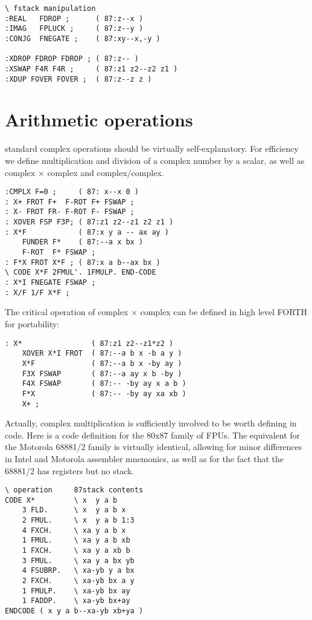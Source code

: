 \begin{lstlisting}
\ fstack manipulation
:REAL   FDROP ;      ( 87:z--x )
:IMAG   FPLUCK ;     ( 87:z--y )
:CONJG  FNEGATE ;    ( 87:xy--x,-y )

:XDROP FDROP FDROP ; ( 87:z-- )
:XSWAP F4R F4R ;     ( 87:z1 z2--z2 z1 )
:XDUP FOVER FOVER ;  ( 87:z--z z )
\end{lstlisting}

\section{Arithmetic operations}
 standard complex operations should be virtually self-explanatory. For efficiency we define multiplication and division of a complex number by a scalar, as well as complex $\times$ complex and complex/complex.

\begin{lstlisting}
:CMPLX F=0 ;     ( 87: x--x 0 )
: X+ FROT F+  F-ROT F+ FSWAP ;
: X- FROT FR- F-ROT F- FSWAP ;
: XOVER FSP F3P; ( 87:z1 z2--z1 z2 z1 )
: X*F            ( 87:x y a -- ax ay )
    FUNDER F*    ( 87:--a x bx )
    F-ROT  F* FSWAP ;
: F*X FROT X*F ; ( 87:x a b--ax bx )
\ CODE X*F 2FMUL'. 1FMULP. END-CODE
: X*I FNEGATE FSWAP ;
: X/F 1/F X*F ;
\end{lstlisting}

The critical operation of complex $\times$ complex can be defined in high level FORTH for portability:

\begin{lstlisting}
: X*                ( 87:z1 z2--z1*z2 )
    XOVER X*I FROT  ( 87:--a b x -b a y )
    X*F             ( 87:--a b x -by ay )
    F3X FSWAP       ( 87:--a ay x b -by )
    F4X FSWAP       ( 87:-- -by ay x a b )
    F*X             ( 87:-- -by ay xa xb )
    X+ ;
\end{lstlisting}

Actually, complex multiplication is sufficiently involved to be worth defining in code. Here is a code definition for the 80x87 family of FPUs. The equivalent for the Motorola 68881/2 family is virtually identical, allowing for minor differences in Intel and Motorola assembler mnemonics, as well as for the fact that the 68881/2 has registers but no stack.

\begin{lstlisting}
\ operation     87stack contents
CODE X*         \ x  y a b
    3 FLD.      \ x  y a b x
    2 FMUL.     \ x  y a b 1:3
    4 FXCH.     \ xa y a b x
    1 FMUL.     \ xa y a b xb
    1 FXCH.     \ xa y a xb b
    3 FMUL.     \ xa y a bx yb
    4 FSUBRP.   \ xa-yb y a bx
    2 FXCH.     \ xa-yb bx a y
    1 FMULP.    \ xa-yb bx ay
    1 FADDP.    \ xa-yb bx+ay
ENDCODE ( x y a b--xa-yb xb+ya )
\end{lstlisting}

